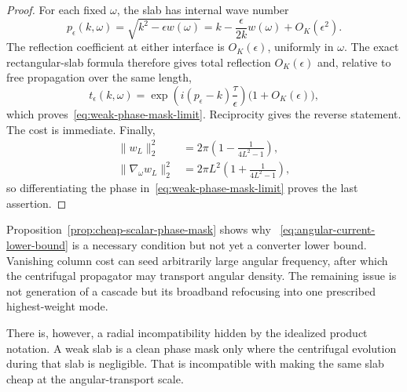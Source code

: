 \documentclass[11pt]{article}
\theoremstyle{definition}
\theoremstyle{remark}
\begin{document}
\begin{proof}
For each fixed $\omega$, the slab has internal wave number
\begin{equation}
 p_\epsilon(k,\omega)=\sqrt{k^2-\epsilon w(\omega)}
 =k-\frac{\epsilon}{2k}w(\omega)+O_K(\epsilon^2).
\end{equation}
The reflection coefficient at either interface is $O_K(\epsilon)$, uniformly
in $\omega$.  The exact rectangular-slab formula therefore gives total
reflection $O_K(\epsilon)$ and, relative to free propagation over the same
length,
\begin{equation}
 t_\epsilon(k,\omega)
 =\exp\!\left(i(p_\epsilon-k)\frac{\tau}{\epsilon}\right)
  \bigl(1+O_K(\epsilon)\bigr),
\end{equation}
which proves~\eqref{eq:weak-phase-mask-limit}.  Reciprocity gives the reverse
statement.  The cost is immediate.  Finally,
\begin{align}
 \|w_L\|_2^2
 &=2\pi\left(1-\frac1{4L^2-1}\right),\\
 \|\nabla_\omega w_L\|_2^2
 &=2\pi L^2\left(1+\frac1{4L^2-1}\right),
\end{align}
so differentiating the phase in~\eqref{eq:weak-phase-mask-limit} proves the
last assertion.
\end{proof}

Proposition~\ref{prop:cheap-scalar-phase-mask} shows why
~\eqref{eq:angular-current-lower-bound} is a necessary condition but not yet a
converter lower bound.  Vanishing column cost can seed arbitrarily large
angular frequency, after which the centrifugal propagator may transport
angular density.  The remaining issue is not generation of a cascade but its
broadband refocusing into one prescribed highest-weight mode.

There is, however, a radial incompatibility hidden by the idealized product
notation.  A weak slab is a clean phase mask only where the centrifugal
evolution during that slab is negligible.  That is incompatible with making
the same slab cheap at the angular-transport scale.
\end{document}
